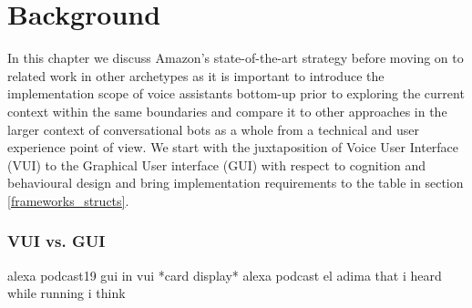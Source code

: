 \chapter{Background}
\label{background}




In this chapter we discuss Amazon's state-of-the-art strategy before moving on to related work in other archetypes as it is important to introduce the implementation scope of voice assistants bottom-up prior to exploring the current context within the same boundaries and compare it to other approaches in the larger context of conversational bots as a whole from a technical and user experience point of view. We start with the juxtaposition of Voice User Interface (VUI) to the Graphical User interface (GUI) with respect to cognition and behavioural design and bring implementation requirements to the table in section \ref{frameworks_structs}. 




\subsection*{VUI vs. GUI} alexa podcast19
gui in vui *card display* alexa podcast el adima that i heard while running i think




